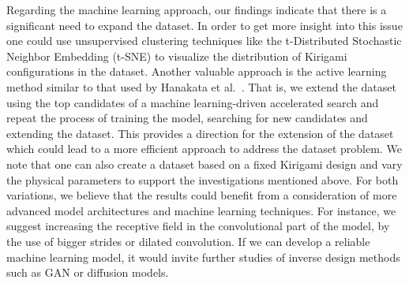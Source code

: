 Regarding the machine learning approach, our findings indicate that there is a
significant need to expand the dataset. In order to get more insight into this
issue one could use unsupervised clustering techniques like the t-Distributed
Stochastic Neighbor Embedding (t-SNE) to visualize the distribution of Kirigami
configurations in the dataset. Another valuable approach is the active learning
method similar to that used by Hanakata et al.~\cite{PhysRevLett.121.255304}.
That is, we extend the dataset using the top candidates of a machine
learning-driven accelerated search and repeat the process of training the model,
searching for new candidates and extending the dataset. This provides a
direction for the extension of the dataset which could lead to a more efficient
approach to address the dataset problem. We note that one can also create a dataset based on a fixed Kirigami design and vary the physical parameters to support the investigations mentioned above. For both variations, we believe that the results could benefit from a consideration of more advanced model architectures and machine learning techniques. For instance, we suggest increasing the receptive field in the convolutional part of the model, by the use of bigger strides or dilated convolution. If we can develop a reliable machine learning model, it would invite further studies of inverse design methods such as \acrshort{GAN} or diffusion models. 

